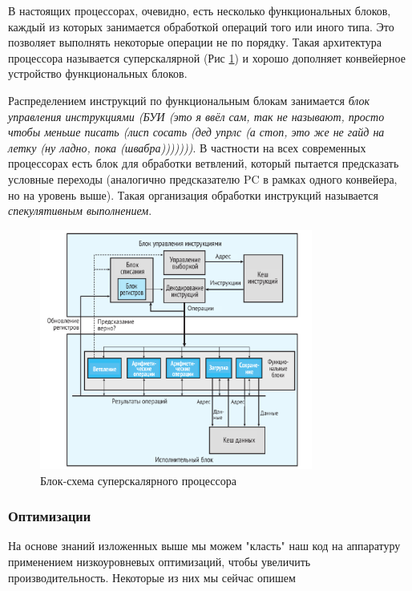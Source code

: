 \documentclass[12pt,a4paper]{article}
\begin{document}
В настоящих процессорах, очевидно, есть несколько функциональных блоков, каждый из которых занимается обработкой операций того или иного типа. Это позволяет выполнять некоторые операции не по порядку. Такая архитектура процессора называется суперскалярной (Рис \ref{fig:superscalar}) и хорошо дополняет конвейерное устройство функциональных блоков.

Распределением инструкций по функциональным блокам занимается \textit{блок управления инструкциями (БУИ (это я ввёл сам, так не называют, просто чтобы меньше писать (лисп сосать (дед упрлс (а стоп, это же не гайд на летку (ну ладно, пока (швабра)))))))}. В частности на всех современных процессорах есть блок для обработки ветвлений, который пытается предсказать условные переходы (аналогично предсказателю PC в рамках одного конвейера, но на уровень выше). Такая организация обработки инструкций называется \textit{спекулятивным выполнением}.

\begin{figure}[ht!]
    \centering
    \includegraphics[width=0.8\textwidth]{supscalar.png}
    \caption{Блок-схема суперскалярного процессора}
    \label{fig:superscalar}
\end{figure}


\subsubsection{Оптимизации}

На основе знаний изложенных выше мы можем "класть" наш код на аппаратуру применением низкоуровневых оптимизаций, чтобы увеличить производительность. Некоторые из них мы сейчас опишем
\end{document}
